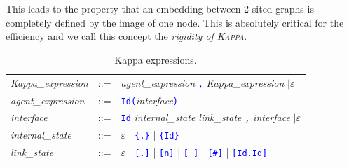 \documentclass[11pt]{book}
\def\Kappa{\textsc{Kappa}}
\def\tcb#1{\textcolor{blue}{\ttt{#1}}}
\def\ttt#1{\texttt{#1}}
\begin{document}
This leads to the property that an embedding between 2 sited graphs is
completely defined by the image of one node. This is absolutely
critical for the efficiency and we call this concept the
\emph{rigidity of \Kappa{}}.

\begin{table}[ht!]
  \centering
  \caption{Kappa expressions.}
  \begin{tabular}{@{} lcl @{}}
    \textit{Kappa\_expression} & ::= & \textit{agent\_expression} \tcb{,} \textit{Kappa\_expression} $\mid\varepsilon$ \\
    \textit{agent\_expression} & ::= &  \tcb{Id}\tcb{(}\textit{interface}\tcb{)} \\
    \textit{interface} &::=& \tcb{Id} \textit{internal\_state link\_state}  \tcb{,} \textit{interface} $\mid\varepsilon$ \\
    \textit{internal\_state} &::=& $\varepsilon$ | \tcb{\{.\}} | \tcb{\{Id\}} \\
    \textit{link\_state} &::=& $\varepsilon$ | \tcb{[.]} | \tcb{[n]} | \tcb{[\_]} | \tcb{[\#]}  | \tcb{[Id.Id]} \\
    \end{tabular}
  \label{tab:patterns}
\end{table}
\end{document}
